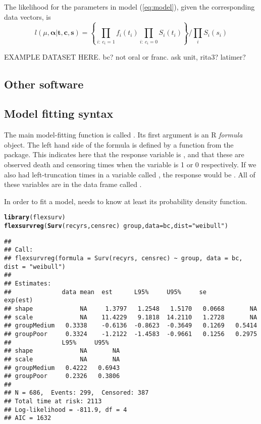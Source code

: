 \documentclass[nojss,nofooter]{jss}\usepackage[]{graphicx}\usepackage[]{color}
\makeatletter
\newcommand{\hlstr}[1]{\textcolor[rgb]{0.192,0.494,0.8}{#1}}%
\newcommand{\hlopt}[1]{\textcolor[rgb]{0,0,0}{#1}}%
\newcommand{\hlstd}[1]{\textcolor[rgb]{0.345,0.345,0.345}{#1}}%
\newcommand{\hlkwc}[1]{\textcolor[rgb]{0.333,0.667,0.333}{#1}}%
\newcommand{\hlkwd}[1]{\textcolor[rgb]{0.737,0.353,0.396}{\textbf{#1}}}%
\newenvironment{kframe}{%
 \def\at@end@of@kframe{}%
 \ifinner\ifhmode%
  \def\at@end@of@kframe{\end{minipage}}%
  \begin{minipage}{\columnwidth}%
 \fi\fi%
 \def\FrameCommand##1{\hskip\@totalleftmargin \hskip-\fboxsep
 \colorbox{shadecolor}{##1}\hskip-\fboxsep
     \hskip-\linewidth \hskip-\@totalleftmargin \hskip\columnwidth}%
 \MakeFramed {\advance\hsize-\width
   \@totalleftmargin\z@ \linewidth\hsize
   \@setminipage}}%
 {\par\unskip\endMakeFramed%
 \at@end@of@kframe}
\newenvironment{knitrout}{}{} %
\makeatother
\begin{document}
The likelihood for the parameters in model (\ref{eq:model}), given the corresponding data vectors, is 
\[
l(\mu,\bm{\alpha} | \mathbf{t},\mathbf{c},\mathbf{s}) = \left\{ \prod_{i:\ c_i=1} f_i(t_i) \prod_{i:\ c_i=0} S_i(t_i) \right\} / \prod_i S_i(s_i)
\]

EXAMPLE DATASET HERE. 
bc?  not oral or franc.  ask unit, rita3? latimer?


\subsection{Other software} 

\subsection{Model fitting syntax} 

The main model-fitting function is called .  Its
first argument is an R \emph{formula} object.  The left hand side of
the formula is defined by a  function from the
 package.  This indicates here that the response
variable is , and that these are observed death and
censoring times when the variable  is 1 or 0
respectively.  If we also had left-truncation times in a variable
called , the response would be
.  All of these variables are in the
data frame called .

In order to fit a model, needs to know at least its probability density function. 
\begin{knitrout}
\color{fgcolor}\begin{kframe}
\begin{alltt}
\hlkwd{library}\hlstd{(flexsurv)}
\hlkwd{flexsurvreg}\hlstd{(}\hlkwd{Surv}\hlstd{(recyrs, censrec)} \hlopt{~} \hlstd{group,} \hlkwc{data}\hlstd{=bc,} \hlkwc{dist}\hlstd{=}\hlstr{"weibull"}\hlstd{)}
\end{alltt}


{\ttfamily\noindent\color{warningcolor}{\#\# Warning: NaNs produced\\\#\# Warning: NaNs produced\\\#\# Warning: NaNs produced}}\begin{verbatim}
## 
## Call:
## flexsurvreg(formula = Surv(recyrs, censrec) ~ group, data = bc,     dist = "weibull")
## 
## Estimates: 
##              data mean  est      L95%     U95%     se       exp(est)
## shape             NA     1.3797   1.2548   1.5170   0.0668       NA 
## scale             NA    11.4229   9.1818  14.2110   1.2728       NA 
## groupMedium   0.3338    -0.6136  -0.8623  -0.3649   0.1269   0.5414 
## groupPoor     0.3324    -1.2122  -1.4583  -0.9661   0.1256   0.2975 
##              L95%     U95%   
## shape             NA       NA
## scale             NA       NA
## groupMedium   0.4222   0.6943
## groupPoor     0.2326   0.3806
## 
## N = 686,  Events: 299,  Censored: 387
## Total time at risk: 2113
## Log-likelihood = -811.9, df = 4
## AIC = 1632
\end{verbatim}
\end{kframe}
\end{knitrout}
\end{document}
